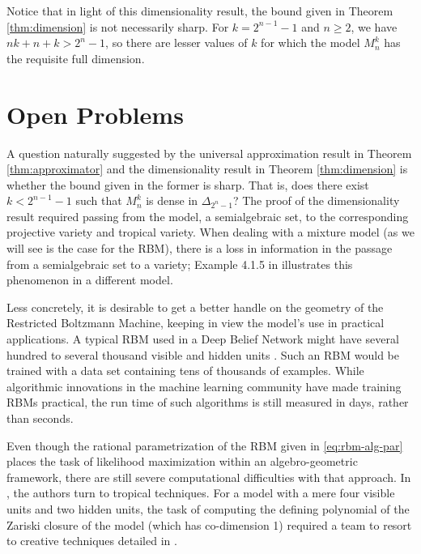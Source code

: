 \documentclass[cclicense]{hmcthesis}
\numberwithin{equation}{section}
\begin{document}
    Notice that in light of this dimensionality result, the bound given in
    Theorem \ref{thm:dimension} is not necessarily sharp.  For $k = 2^{n-1}-1$
    and $n \ge 2$, we have $nk+n+k > 2^n-1$, so there are lesser values of $k$
    for which the model $M_n^k$ has the requisite full dimension.

\section{Open Problems}

    A question naturally suggested by the universal approximation result in
    Theorem \ref{thm:approximator} and the dimensionality result in Theorem
    \ref{thm:dimension} is whether the bound given in the former is sharp.  That
    is, does there exist $k < 2^{n-1}-1$ such that $M_n^k$ is dense in
    $\Delta_{2^n-1}$?  The proof of the dimensionality result required passing
    from the model, a semialgebraic set, to the corresponding projective variety
    and tropical variety.  When dealing with a mixture model (as we will see is
    the case for the RBM), there is a loss in information in the passage from a
    semialgebraic set to a variety; Example 4.1.5 in \citep{DSS08} illustrates
    this phenomenon in a different model.

    Less concretely, it is desirable to get a better handle on the geometry of
    the Restricted Boltzmann Machine, keeping in view the model's use in
    practical applications.  A typical RBM used in a Deep Belief Network might
    have several hundred to several thousand visible and hidden units
    \citep{Hin07}.  Such an RBM would be trained with a data set containing tens
    of thousands of examples.  While algorithmic innovations in the machine
    learning community have made training RBMs practical, the run time of such
    algorithms is still measured in days, rather than seconds.
    
    Even though the rational parametrization of the RBM given in
    \eqref{eq:rbm-alg-par} places the task of likelihood maximization within an
    algebro-geometric framework, there are still severe computational
    difficulties with that approach.  In \citep{CMS09}, the authors turn to
    tropical techniques.  For a model with a mere four visible units and two
    hidden units, the task of computing the defining polynomial of the Zariski
    closure of the model (which has co-dimension 1) required a team to resort
    to creative techniques detailed in \citep{CTY10}.  
\end{document}
